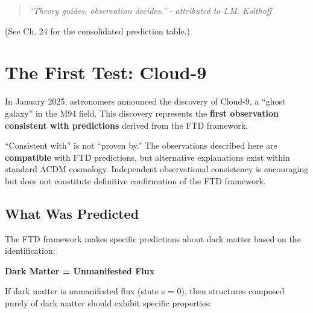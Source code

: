 \documentclass[
  11pt,
  letterpaper,
  twoside,
  openright]{book}
\begin{document}
\begin{quote}
\emph{``Theory guides, observation decides.''} \emph{- attributed to
I.M. Kolthoff}
\end{quote}

(See Ch. 24 for the consolidated prediction table.)

\section{The First Test: Cloud-9}\label{sec-cloud9}

In January 2025, astronomers announced the discovery of Cloud-9, a
``ghost galaxy'' in the M94 field. This discovery represents the
\textbf{first observation consistent with predictions} derived from the
FTD framework.

\begin{tcolorbox}[enhanced jigsaw, coltitle=black, colbacktitle=quarto-callout-warning-color!10!white, toprule=.15mm, colframe=quarto-callout-warning-color-frame, arc=.35mm, opacityback=0, bottomtitle=1mm, toptitle=1mm, breakable, colback=white, titlerule=0mm, opacitybacktitle=0.6, title=\textcolor{quarto-callout-warning-color}{\faExclamationTriangle}\hspace{0.5em}{Epistemic Caution}, rightrule=.15mm, bottomrule=.15mm, leftrule=.75mm, left=2mm]

``Consistent with'' is not ``proven by.'' The observations described
here are \textbf{compatible} with FTD predictions, but alternative
explanations exist within standard ΛCDM cosmology. Independent
observational consistency is encouraging but does not constitute
definitive confirmation of the FTD framework.

\end{tcolorbox}

\subsection{What Was Predicted}\label{what-was-predicted}

The FTD framework makes specific predictions about dark matter based on
the identification:

\textbf{Dark Matter = Unmanifested Flux}

If dark matter is unmanifested flux (state s = 0), then structures
composed purely of dark matter should exhibit specific properties:
\end{document}

